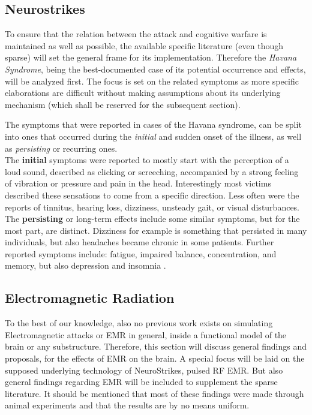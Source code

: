     
    \subsection{Neurostrikes}
    To ensure that the relation between the attack and cognitive warfare is maintained as well as possible, the available specific literature (even though sparse) will set the general frame for its implementation. Therefore the \textit{Havana Syndrome}, being the best-documented case of its potential occurrence and effects, will be analyzed first. The focus is set on the related symptoms as more specific elaborations are difficult without making assumptions about its underlying mechanism (which shall be reserved for the subsequent section).
    
    The symptoms that were reported in cases of the Havana syndrome, can be split into ones that occurred during the \textit{initial} and sudden onset of the illness, as well as \textit{persisting} or recurring ones.\\
    The \textbf{initial} symptoms were reported to mostly start with the perception of a loud sound, described as clicking or screeching, accompanied by a strong feeling of vibration or pressure and pain in the head. Interestingly most victims described these sensations to come from a specific direction. Less often were the reports of tinnitus, hearing loss, dizziness, unsteady gait, or visual disturbances.\\
    The \textbf{persisting} or long-term effects include some similar symptoms, but for the most part, are distinct. Dizziness for example is something that persisted in many individuals, but also headaches became chronic in some patients. Further reported symptoms include: fatigue, impaired balance, concentration, and memory, but also depression and insomnia \cite{Pavlin.2020}.
    

    \subsection{Electromagnetic Radiation}
    To the best of our knowledge, also no previous work exists on simulating Electromagnetic attacks or EMR in general, inside a functional model of the brain or any substructure. Therefore, this section will discuss general findings and proposals, for the effects of EMR on the brain. A special focus will be laid on the supposed underlying technology of NeuroStrikes, pulsed RF EMR. But also general findings regarding EMR will be included to supplement the sparse literature. It should be mentioned that most of these findings were made through animal experiments and that the results are by no means uniform.

